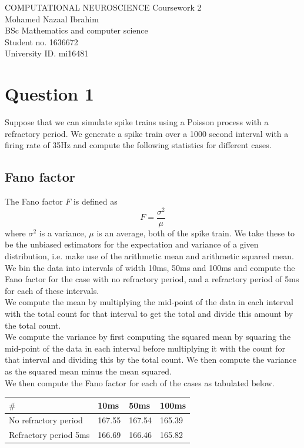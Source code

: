 \documentclass[12pt]{article}
\begin{document}
\begin{titlepage}\centering
    \LARGE COMPUTATIONAL NEUROSCIENCE
    \LARGE Coursework 2\\
    \Large Mohamed Nazaal Ibrahim\\
    \Large BSc Mathematics and computer science\\
    \Large Student no. 1636672\\
    \Large University ID. mi16481
\end{titlepage}

\setcounter{secnumdepth}{0}
\section{Question 1}
Suppose that we can simulate spike trains using a Poisson process with a refractory period. We generate a spike train over a 1000 second interval with a firing rate of 35Hz and compute the following statistics for different cases.

\subsection{Fano factor}
The Fano factor $F$ is defined as
\begin{equation}
    F = \frac{\sigma^2}{\mu}
\end{equation}
where $\sigma^2$ is a variance, $\mu$ is an average, both of the spike train. We take these to be the unbiased estimators for the expectation and variance of a given distribution, i.e. make use of the arithmetic mean and arithmetic squared mean. \\
We bin the data into intervals of width 10ms, 50ms and 100ms and compute the Fano factor for the case with no refractory period, and a refractory period of 5ms for each of these intervals.\\
We compute the mean by multiplying the mid-point of the data in each interval with the total count for that interval to get the total and divide this amount by the total count.\\
We compute the variance by first computing the squared mean by squaring the mid-point of the data in each interval before multiplying it with the count for that interval and dividing this by the total count. We then compute the variance as the squared mean minus the mean squared.\\
We then compute the Fano factor for each of the cases as tabulated below.

\begin{center}
    \begin{tabular}{ | m{4cm} | m{2cm}| m{2cm} | m{2cm} | } 
    \hline
    $\#$ & 10ms & 50ms & 100ms \\ 
    \hline
    No refractory  period & 167.55 & 167.54 & 165.39\\ 
    \hline
    Refractory period 5ms & 166.69 & 166.46 & 165.82\\ 
    \hline
    \end{tabular}
\end{center}
\end{document}

